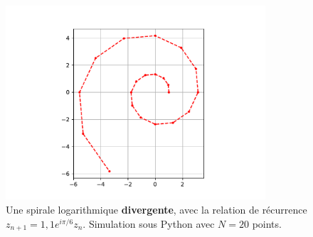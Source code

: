\documentclass[12pt]{article}
\theoremstyle{definition}
\theoremstyle{theorem}
\begin{document}
\begin{figure}[H]
	\centering
	\includegraphics[width=0.86\textwidth]{resources/divergo.pdf}
	\caption{Une spirale logarithmique \textbf{divergente}, avec la relation de récurrence $z_{n+1} = 1,\!1e^{i\pi/6}z_n$. Simulation sous Python avec $N=20$ points.}
\end{figure}
\end{document}
